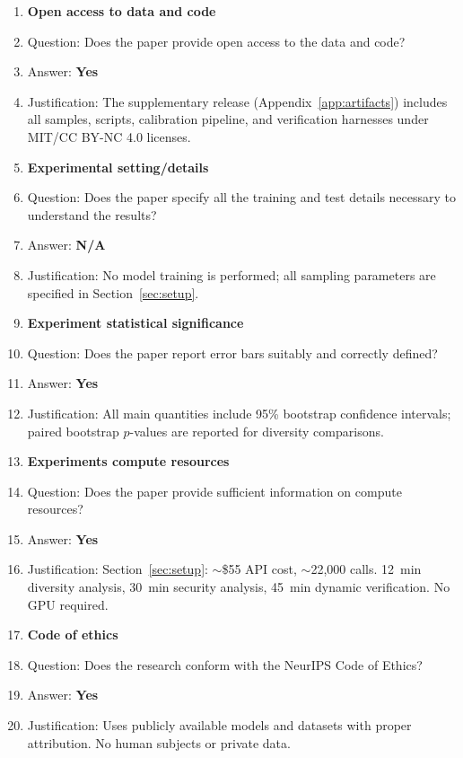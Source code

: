 \documentclass{article}
\providecommand{\answerYes}[1][]{\textbf{Yes}}
\providecommand{\answerNA}[1][]{\textbf{N/A}}
\begin{document}
\begin{enumerate}
\item {\bf Open access to data and code}
    \item[] Question: Does the paper provide open access to the data and code?
    \item[] Answer: \answerYes{}
    \item[] Justification: The supplementary release (Appendix~\ref{app:artifacts}) includes all samples, scripts, calibration pipeline, and verification harnesses under MIT/CC BY-NC 4.0 licenses.

\item {\bf Experimental setting/details}
    \item[] Question: Does the paper specify all the training and test details necessary to understand the results?
    \item[] Answer: \answerNA{}
    \item[] Justification: No model training is performed; all sampling parameters are specified in Section~\ref{sec:setup}.

\item {\bf Experiment statistical significance}
    \item[] Question: Does the paper report error bars suitably and correctly defined?
    \item[] Answer: \answerYes{}
    \item[] Justification: All main quantities include 95\% bootstrap confidence intervals; paired bootstrap $p$-values are reported for diversity comparisons.

\item {\bf Experiments compute resources}
    \item[] Question: Does the paper provide sufficient information on compute resources?
    \item[] Answer: \answerYes{}
    \item[] Justification: Section~\ref{sec:setup}: $\sim$\$55 API cost, $\sim$22,000 calls. 12~min diversity analysis, 30~min security analysis, 45~min dynamic verification. No GPU required.

\item {\bf Code of ethics}
    \item[] Question: Does the research conform with the NeurIPS Code of Ethics?
    \item[] Answer: \answerYes{}
    \item[] Justification: Uses publicly available models and datasets with proper attribution. No human subjects or private data.


\end{enumerate}
\end{document}
